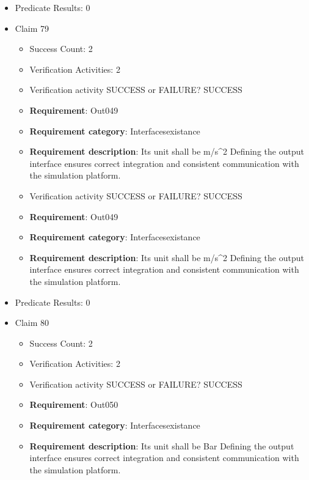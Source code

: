 \documentclass{article}
\begin{document}
\begin{itemize}
\begin{itemize}
				\end{itemize}
				
									    
				\item Predicate Results: 0

  				  \item Claim 79
				\begin{itemize}
			    	\item Success Count: 2 
			    	\item Verification Activities: 2
					\item Verification activity SUCCESS or FAILURE? SUCCESS
		
						\item \textbf{Requirement}: Out049 
						\item \textbf{Requirement category}: Interfacesexistance 
						\item \textbf{Requirement description}: Its unit shall be m/s^2 Defining the output interface ensures correct integration and consistent communication with the simulation platform.
					
					\item Verification activity SUCCESS or FAILURE? SUCCESS
		
						\item \textbf{Requirement}: Out049 
						\item \textbf{Requirement category}: Interfacesexistance 
						\item \textbf{Requirement description}: Its unit shall be m/s^2 Defining the output interface ensures correct integration and consistent communication with the simulation platform.
					
				\end{itemize}
				
									    
				\item Predicate Results: 0

  				  \item Claim 80
				\begin{itemize}
			    	\item Success Count: 2 
			    	\item Verification Activities: 2
					\item Verification activity SUCCESS or FAILURE? SUCCESS
		
						\item \textbf{Requirement}: Out050 
						\item \textbf{Requirement category}: Interfacesexistance 
						\item \textbf{Requirement description}: Its unit shall be Bar Defining the output interface ensures correct integration and consistent communication with the simulation platform.
					

\end{itemize}
\end{itemize}
\end{document}
